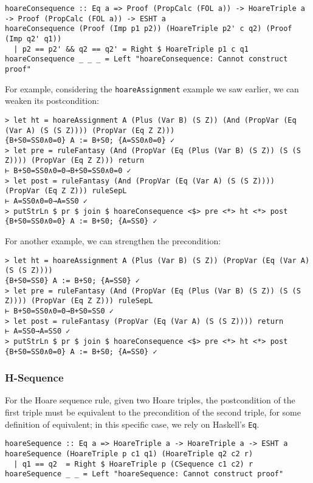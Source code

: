 \documentclass{article}
\begin{document}
\begin{lstlisting}
hoareConsequence :: Eq a => Proof (PropCalc (FOL a)) -> HoareTriple a -> Proof (PropCalc (FOL a)) -> ESHT a
hoareConsequence (Proof (Imp p1 p2)) (HoareTriple p2' c q2) (Proof (Imp q2' q1))
  | p2 == p2' && q2 == q2' = Right $ HoareTriple p1 c q1
hoareConsequence _ _ _ = Left "hoareConsequence: Cannot construct proof"
\end{lstlisting}

For example, considering the \texttt{hoareAssignment} example we saw earlier, we can weaken its postcondition:

\begin{lstlisting}
> let ht = hoareAssignment A (Plus (Var B) (S Z)) (And (PropVar (Eq (Var A) (S (S Z)))) (PropVar (Eq Z Z)))
{B+S0=SS0∧0=0} A := B+S0; {A=SS0∧0=0} ✓
> let pre = ruleFantasy (And (PropVar (Eq (Plus (Var B) (S Z)) (S (S Z)))) (PropVar (Eq Z Z))) return
⊢ B+S0=SS0∧0=0→B+S0=SS0∧0=0 ✓
> let post = ruleFantasy (And (PropVar (Eq (Var A) (S (S Z)))) (PropVar (Eq Z Z))) ruleSepL
⊢ A=SS0∧0=0→A=SS0 ✓
> putStrLn $ pr $ join $ hoareConsequence <$> pre <*> ht <*> post
{B+S0=SS0∧0=0} A := B+S0; {A=SS0} ✓
\end{lstlisting}

For another example, we can strengthen the precondition:

\begin{lstlisting}
> let ht = hoareAssignment A (Plus (Var B) (S Z)) (PropVar (Eq (Var A) (S (S Z))))
{B+S0=SS0} A := B+S0; {A=SS0} ✓
> let pre = ruleFantasy (And (PropVar (Eq (Plus (Var B) (S Z)) (S (S Z)))) (PropVar (Eq Z Z))) ruleSepL
⊢ B+S0=SS0∧0=0→B+S0=SS0 ✓
> let post = ruleFantasy (PropVar (Eq (Var A) (S (S Z)))) return
⊢ A=SS0→A=SS0 ✓
> putStrLn $ pr $ join $ hoareConsequence <$> pre <*> ht <*> post
{B+S0=SS0∧0=0} A := B+S0; {A=SS0} ✓
\end{lstlisting}

\subsubsection{H-Sequence}

For the Hoare sequence rule, given two Hoare triples, the postcondition of the first triple must be equivalent to the precondition of the second triple, for some definition of equivalent; in this specific case, we rely on Haskell's \texttt{Eq}.

\begin{lstlisting}
hoareSequence :: Eq a => HoareTriple a -> HoareTriple a -> ESHT a
hoareSequence (HoareTriple p c1 q1) (HoareTriple q2 c2 r)
  | q1 == q2  = Right $ HoareTriple p (CSequence c1 c2) r
hoareSequence _ _ = Left "hoareSequence: Cannot construct proof"
\end{lstlisting}
\end{document}

